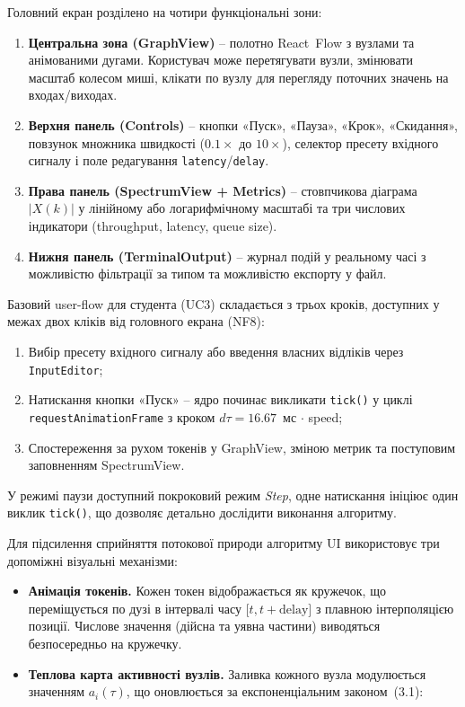 \documentclass[
]{article}
\begin{document}
Головний екран розділено на чотири функціональні зони:

\begin{enumerate}
\def\labelenumi{\arabic{enumi}.}
\item
  \textbf{Центральна зона (GraphView)} -- полотно React~Flow з вузлами
  та анімованими дугами. Користувач може перетягувати вузли, змінювати
  масштаб колесом миші, клікати по вузлу для перегляду поточних значень
  на входах/виходах.
\item
  \textbf{Верхня панель (Controls)} -- кнопки «Пуск», «Пауза», «Крок»,
  «Скидання», повзунок множника швидкості (\(0.1 \times\) до
  \(10 \times\)), селектор пресету вхідного сигналу і поле редагування
  \texttt{latency}/\texttt{delay}.
\item
  \textbf{Права панель (SpectrumView + Metrics)} -- стовпчикова діаграма
  \(|X(k)|\) у лінійному або логарифмічному масштабі та три числових
  індикатори (throughput, latency, queue size).
\item
  \textbf{Нижня панель (TerminalOutput)} -- журнал подій у реальному
  часі з можливістю фільтрації за типом та можливістю експорту у файл.
\end{enumerate}

Базовий user-flow для студента (UC3) складається з трьох кроків,
доступних у межах двох кліків від головного екрана (NF8):

\begin{enumerate}
\def\labelenumi{\arabic{enumi}.}
\item
  Вибір пресету вхідного сигналу або введення власних відліків через
  \texttt{InputEditor};
\item
  Натискання кнопки «Пуск» -- ядро починає викликати
  \texttt{tick}\texttt{()} у циклі \texttt{requestAnimationFrame} з
  кроком \(d\tau = 16.67\)~мс \(\cdot\) speed;
\item
  Спостереження за рухом токенів у GraphView, зміною метрик та
  поступовим заповненням SpectrumView.
\end{enumerate}

У режимі паузи доступний покроковий режим \emph{Step}, одне натискання
ініціює один виклик \texttt{tick}\texttt{()}, що дозволяє детально
дослідити виконання алгоритму.

Для підсилення сприйняття потокової природи алгоритму UI використовує
три допоміжні візуальні механізми:

\begin{itemize}
\item
  \textbf{Анімація токенів.} Кожен токен відображається як кружечок, що
  переміщується по дузі в інтервалі часу
  \(\lbrack t,t + \text{delay}\rbrack\) з плавною інтерполяцією позиції.
  Числове значення (дійсна та уявна частини) виводяться безпосередньо на
  кружечку.
\item
  \textbf{Теплова карта активності вузлів.} Заливка кожного вузла
  модулюється значенням \(a_{i}(\tau)\), що оновлюється за
  експоненціальним законом~(3.1):
\end{itemize}
\end{document}
